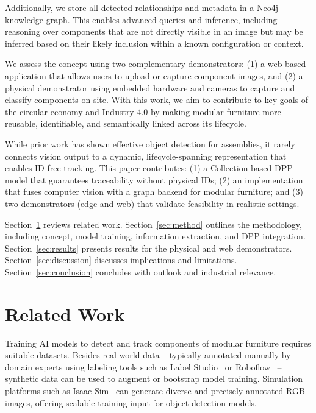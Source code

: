 \documentclass[3p,times,procedia]{elsarticle}
\begin{document}
Additionally, we store all detected relationships and metadata in a Neo4j knowledge graph. This enables advanced queries and inference, including reasoning over components that are not directly visible in an image but may be inferred based on their likely inclusion within a known configuration or context.

We assess the concept using two complementary demonstrators: (1) a web-based application that allows users to upload or capture component images, and (2) a physical demonstrator using embedded hardware and cameras to capture and classify components on-site. With this work, we aim to contribute to key goals of the circular economy and Industry 4.0 by making modular furniture more reusable, identifiable, and semantically linked across its lifecycle.

While prior work has shown effective object detection for assemblies, it rarely connects vision output to a dynamic, lifecycle-spanning representation that enables ID-free tracking. This paper contributes: (1) a Collection-based DPP model that guarantees traceability without physical IDs; (2) an implementation that fuses computer vision with a graph backend for modular furniture; and (3) two demonstrators (edge and web) that validate feasibility in realistic settings.

Section~\ref{sec:related} reviews related work.
Section~\ref{sec:method} outlines the methodology, including concept, model training, information extraction, and DPP integration.
Section~\ref{sec:results} presents results for the physical and web demonstrators.
Section~\ref{sec:discussion} discusses implications and limitations.
Section~\ref{sec:conclusion} concludes with outlook and industrial relevance.

\section{Related Work}
\label{sec:related}

Training AI models to detect and track components of modular furniture requires suitable datasets. Besides real-world data -- typically annotated manually by domain experts using labeling tools such as Label Studio~\cite{Labelstudio} or Roboflow~\cite{dwyer2024roboflow} -- synthetic data can be used to augment or bootstrap model training. Simulation platforms such as Isaac-Sim~\cite{Isaac-Sim} can generate diverse and precisely annotated RGB images, offering scalable training input for object detection models.
\end{document}
